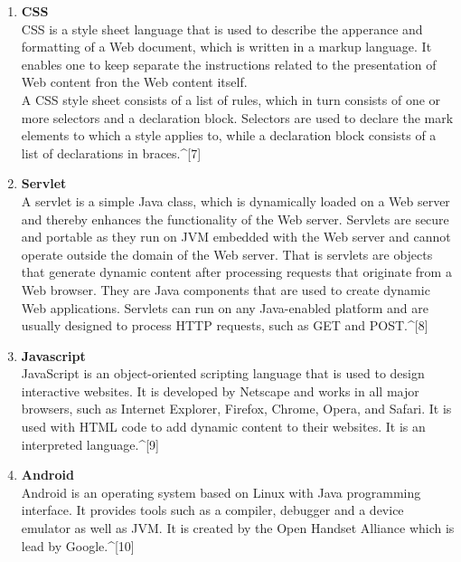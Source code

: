 \documentclass[12pt,a4paper]{article}
\begin{document}
\begin{enumerate}
\\
\item \textbf{CSS}
\\
\hspace{0.7 cm} CSS is a style sheet language that is used to describe the apperance and formatting of a Web document, which is written in a markup language. It enables one to keep separate the instructions related to the presentation of Web content fron the Web content itself.
\\
\hspace{0.7 cm} A CSS style sheet consists of a list of rules, which in turn consists of one or more selectors and a declaration block. Selectors are used to declare the mark elements to which a style applies to, while a declaration block consists of a list of declarations in braces.^{[7]}
\\
\item \textbf{Servlet}
\\
\hspace{0.7 cm} A servlet is a simple Java class, which is dynamically loaded on a Web server and thereby enhances the functionality of the Web server. Servlets are secure and portable as they run on JVM embedded with the Web server and cannot operate outside the domain of the Web server. That is servlets are objects that generate dynamic content after processing requests that originate from a Web browser. They are Java components that are used to create dynamic Web applications. Servlets can run on any Java-enabled platform and are usually designed to process HTTP requests, such as GET and POST.^{[8]}
\\
\item \textbf{Javascript}
\\
\hspace{0.7 cm} JavaScript is an object-oriented scripting language that is used to design interactive websites. It is developed by Netscape and works in all major browsers, such as Internet Explorer, Firefox, Chrome, Opera, and Safari. It is used with HTML code to add dynamic content to their websites. It is an interpreted language.^{[9]}
\\
\item	\textbf{Android}
\\
\hspace{0.7 cm} Android is an operating system based on Linux with Java programming interface. It provides tools such as a compiler, debugger and a device emulator as well as JVM. It is created by the Open Handset Alliance which is lead by Google.^{[10]}

\end{enumerate}
\end{document}

